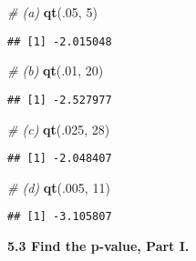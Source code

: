 \documentclass[]{book}
\newenvironment{Shaded}{\begin{snugshade}}{\end{snugshade}}
\newcommand{\CommentTok}[1]{\textcolor[rgb]{0.56,0.35,0.01}{\textit{#1}}}
\newcommand{\DecValTok}[1]{\textcolor[rgb]{0.00,0.00,0.81}{#1}}
\newcommand{\KeywordTok}[1]{\textcolor[rgb]{0.13,0.29,0.53}{\textbf{#1}}}
\newcommand{\NormalTok}[1]{#1}
\begin{document}
\begin{Shaded}
\begin{Highlighting}[]
\CommentTok{# (a)}
\KeywordTok{qt}\NormalTok{(.}\DecValTok{05}\NormalTok{, }\DecValTok{5}\NormalTok{)}
\end{Highlighting}
\end{Shaded}

\begin{verbatim}
## [1] -2.015048
\end{verbatim}

\begin{Shaded}
\begin{Highlighting}[]
\CommentTok{# (b)}
\KeywordTok{qt}\NormalTok{(.}\DecValTok{01}\NormalTok{, }\DecValTok{20}\NormalTok{)}
\end{Highlighting}
\end{Shaded}

\begin{verbatim}
## [1] -2.527977
\end{verbatim}

\begin{Shaded}
\begin{Highlighting}[]
\CommentTok{# (c)}
\KeywordTok{qt}\NormalTok{(.}\DecValTok{025}\NormalTok{, }\DecValTok{28}\NormalTok{)}
\end{Highlighting}
\end{Shaded}

\begin{verbatim}
## [1] -2.048407
\end{verbatim}

\begin{Shaded}
\begin{Highlighting}[]
\CommentTok{# (d)}
\KeywordTok{qt}\NormalTok{(.}\DecValTok{005}\NormalTok{, }\DecValTok{11}\NormalTok{)}
\end{Highlighting}
\end{Shaded}

\begin{verbatim}
## [1] -3.105807
\end{verbatim}

\textbf{5.3 Find the p-value, Part I.}
\end{document}
